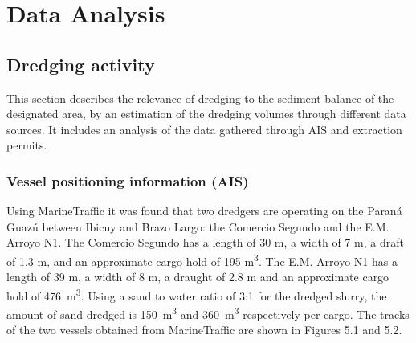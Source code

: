 \chapter{Data Analysis}

\section{Dredging activity}
This section describes the relevance of dredging to the sediment balance of the designated area, by an estimation of the dredging volumes through different data sources. It includes an analysis of the data gathered through AIS and extraction permits. 


\subsection{Vessel positioning information (AIS)}

Using MarineTraffic it was found that two dredgers are operating on the Paraná Guazú between Ibicuy and Brazo Largo: the Comercio Segundo and the E.M. Arroyo N1. The Comercio Segundo has a length of 30 m, a width of 7 m, a draft of 1.3 m, and an approximate cargo hold of 195 m\textsuperscript{3}. The E.M. Arroyo N1 has a length of 39 m, a width of 8 m, a draught of 2.8 m and an approximate cargo hold of 476 \,m\textsuperscript{3}. Using a sand to water ratio of 3:1 for the dredged slurry, the amount of sand dredged is 150 \,m\textsuperscript{3} and 360 \,m\textsuperscript{3} respectively per cargo. The tracks of the two vessels obtained from MarineTraffic are shown in Figures 5.1 and 5.2.

